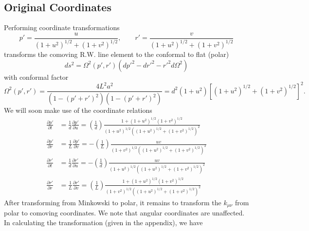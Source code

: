 \documentclass[10pt,letterpaper]{article}
\begin{document}
\subsection*{Original Coordinates}
Performing coordinate transformations
\begin{equation}
p' = \frac{u}{(1+u^2)^{1/2}+(1+v^2)^{1/2}},\qquad r' = \frac{v}{(1+u^2)^{1/2}+(1+v^2)^{1/2}}
\end{equation}
transforms the comoving R.W. line element to the conformal to flat (polar)
\begin{equation}
ds^2 = \Omega^2(p',r')(dp'^2 - dr'^2 - r'^2 d\Omega^2)
\end{equation}
with conformal factor
\begin{equation}
\Omega^2(p',r') = \frac{4 L^2 a^2}{(1-(p'+r')^2)(1-(p'+r')^2)} = d^2(1+u^2)\left[ (1+u^2)^{1/2}+(1+v^2)^{1/2}\right]^2.
\end{equation}
We will soon make use of the coordinate relations
\begin{align}
\frac{\partial p'}{\partial t} &= \frac{1}{d}\frac{\partial p'}{\partial u} = \left(\frac1d\right)\frac{1+(1+u^2)^{1/2}(1+v^2)^{1/2}}{(1+u^2)^{1/2}((1+u^2)^{1/2}+(1+v^2)^{1/2})^2}\nonumber\\
\frac{\partial p'}{\partial r} &= \frac{1}{L}\frac{\partial p'}{\partial v} = -  \left(\frac1L\right)\frac{uv}{(1+v^2)^{1/2}((1+u^2)^{1/2}+(1+v^2)^{1/2})^2}\nonumber\\
\frac{\partial r'}{\partial t} &= \frac{1}{d}\frac{\partial r'}{\partial u} = -  \left(\frac1d\right)\frac{uv}{(1+u^2)^{1/2}((1+u^2)^{1/2}+(1+v^2)^{1/2})^2}\nonumber\\
\frac{\partial r'}{\partial r} &= \frac{1}{L}\frac{\partial r'}{\partial v} = \left(\frac1L\right) \frac{1+(1+u^2)^{1/2}(1+v^2)^{1/2}}{(1+v^2)^{1/2}((1+u^2)^{1/2}+(1+v^2)^{1/2})^2}
\end{align}
After transforming from Minkowski to polar, it remains to transform the $k_{\mu\nu}$ from polar to comoving coordinates. We note that angular coordinates are unaffected. In calculating the transformation (given in the appendix), we have
\end{document}
